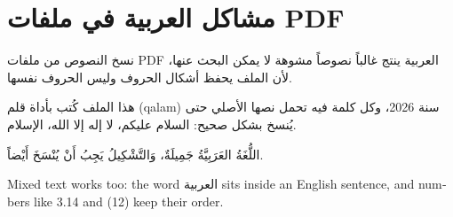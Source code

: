 \documentclass{article}
\begin{document}
\section*{مشاكل العربية في ملفات PDF}

نسخ النصوص من ملفات PDF العربية ينتج غالباً نصوصاً مشوهة لا يمكن البحث عنها، لأن الملف يحفظ أشكال الحروف وليس الحروف نفسها.

هذا الملف كُتب بأداة قلم (qalam) سنة 2026، وكل كلمة فيه تحمل نصها الأصلي حتى يُنسخ بشكل صحيح: السلام عليكم، لا إله إلا الله، الإسلام.

اللُّغَةُ العَرَبِيَّةُ جَمِيلَةٌ، وَالتَّشْكِيلُ يَجِبُ أَنْ يُنْسَخَ أَيْضاً.

\begin{english}Mixed text works too: the word العربية sits inside an English sentence, and numbers like 3.14 and (12) keep their order.\end{english}
\end{document}
